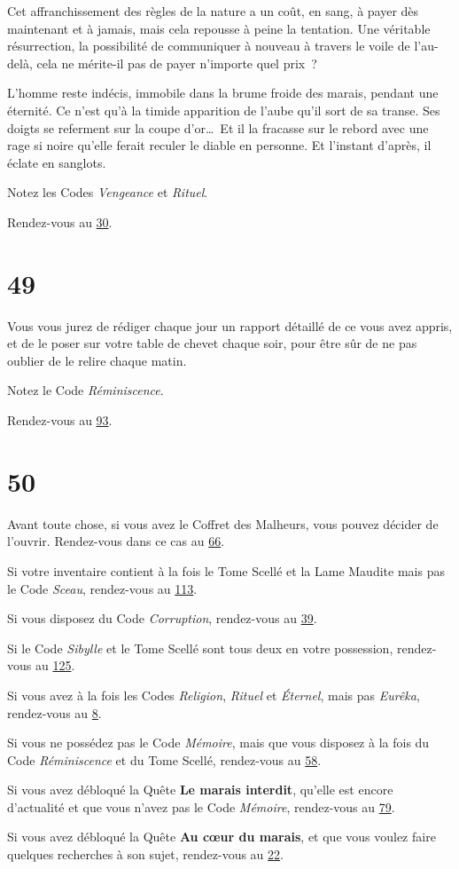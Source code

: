 \documentclass{report}
\newcommand{\gsection}[1]{
    \section{#1}
    \label{section-#1}
}
\newcommand{\glink}[1]{\hyperref[section-#1]{#1}}
\begin{document}
Cet affranchissement des règles de la nature a un coût, en sang, à payer dès maintenant et à jamais, mais cela repousse à peine la tentation. Une véritable résurrection, la possibilité de communiquer à nouveau à travers le voile de l'au-delà, cela ne mérite-il pas de payer n'importe quel prix ?

L'homme reste indécis, immobile dans la brume froide des marais, pendant une éternité. Ce n'est qu'à la timide apparition de l'aube qu'il sort de sa transe. Ses doigts se referment sur la coupe d'or\dots~Et il la fracasse sur le rebord avec une rage si noire qu'elle ferait reculer le diable en personne. Et l'instant d'après, il éclate en sanglots.

Notez les Codes \emph{Vengeance} et \emph{Rituel}.

Rendez-vous au \glink{30}.

\gsection{49}

Vous vous jurez de rédiger chaque jour un rapport détaillé de ce vous avez appris, et de le poser sur votre table de chevet chaque soir, pour être sûr de ne pas oublier de le relire chaque matin.

Notez le Code \emph{Réminiscence}.

Rendez-vous au \glink{93}.

\gsection{50}

Avant toute chose, si vous avez le Coffret des Malheurs, vous pouvez décider de l'ouvrir. Rendez-vous dans ce cas au \glink{66}.

Si votre inventaire contient à la fois le Tome Scellé et la Lame Maudite mais pas le Code \emph{Sceau}, rendez-vous au \glink{113}.

Si vous disposez du Code \emph{Corruption}, rendez-vous au \glink{39}.

Si le Code \emph{Sibylle} et le Tome Scellé sont tous deux en votre possession, rendez-vous au \glink{125}.

Si vous avez à la fois les Codes \emph{Religion}, \emph{Rituel} et \emph{Éternel}, mais pas \emph{Eurêka}, rendez-vous au \glink{8}.

Si vous ne possédez pas le Code \emph{Mémoire}, mais que vous disposez à la fois du Code \emph{Réminiscence} et du Tome Scellé, rendez-vous au \glink{58}.

Si vous avez débloqué la Quête \textbf{Le marais interdit}, qu'elle est encore d'actualité et que vous n'avez pas le Code \emph{Mémoire}, rendez-vous au \glink{79}.

Si vous avez débloqué la Quête \textbf{Au cœur du marais}, et que vous voulez faire quelques recherches à son sujet, rendez-vous au \glink{22}.
\end{document}
